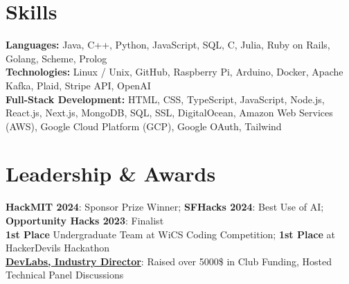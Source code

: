 \documentclass[11pt]{article}       %
\begin{document}

\vspace{-15.5pt}

\section*{Skills}
\textbf{Languages:} Java,  C++, Python, JavaScript, SQL, C, Julia, Ruby on Rails, Golang, Scheme, Prolog \\
\textbf{Technologies:} Linux / Unix, GitHub, Raspberry Pi, Arduino, Docker, Apache Kafka, Plaid, Stripe API, OpenAI\\
\textbf{Full-Stack Development:} HTML, CSS, TypeScript, JavaScript, Node.js, React.js, Next.js, MongoDB, SQL, SSL, DigitalOcean, Amazon Web Services (AWS), Google Cloud Platform (GCP), Google OAuth, Tailwind \\


\vspace{-6.5pt}

\section*{Leadership \& Awards}
\textbf{HackMIT 2024}: Sponsor Prize Winner; 
\textbf{SFHacks 2024}: Best Use of AI; 
\textbf{Opportunity Hacks 2023}: Finalist   \\ 
\textbf{1st Place} Undergraduate Team at WiCS Coding Competition; \textbf{1st Place} at HackerDevils Hackathon \\
\textbf{\href{https://devlabs.club/}{DevLabs, Industry Director}}: Raised over 5000\$ in Club Funding, Hosted Technical Panel Discussions \\
\end{document}
